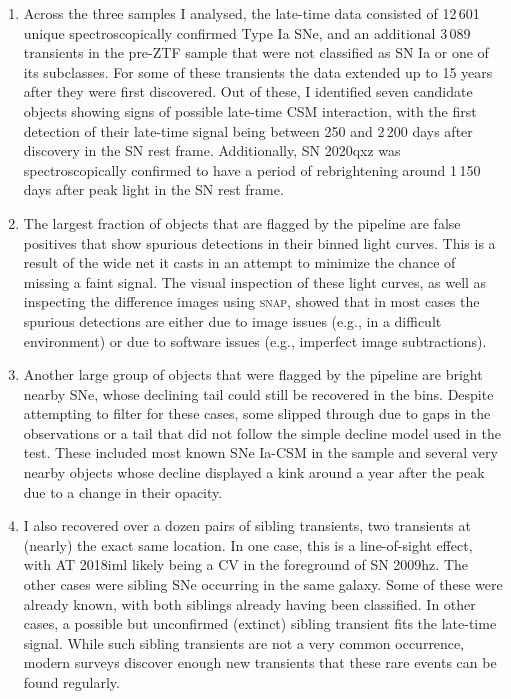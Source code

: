 \documentclass[a4paper,oneside,12pt, class=Latex/Classes/PhDthesisPSnPDF, crop=false]{standalone}
\begin{document}
\begin{enumerate}
	\item Across the three samples I analysed, the late-time data consisted of 12\,601 unique spectroscopically confirmed Type Ia SNe, and an additional 3\,089 transients in the pre-ZTF sample that were not classified as SN Ia or one of its subclasses. For some of these transients the data extended up to 15 years after they were first discovered. Out of these, I identified seven candidate objects showing signs of possible late-time CSM interaction, with the first detection of their late-time signal being between 250 and 2\,200 days after discovery in the SN rest frame. Additionally, SN 2020qxz was spectroscopically confirmed to have a period of rebrightening around 1\,150 days after peak light in the SN rest frame.
	\item The largest fraction of objects that are flagged by the pipeline are false positives that show spurious detections in their binned light curves. This is a result of the wide net it casts in an attempt to minimize the chance of missing a faint signal. The visual inspection of these light curves, as well as inspecting the difference images using \textsc{snap}, showed that in most cases the spurious detections are either due to image issues (e.g., in a difficult environment) or due to software issues (e.g., imperfect image subtractions).
	\item Another large group of objects that were flagged by the pipeline are bright nearby SNe, whose declining tail could still be recovered in the bins. Despite attempting to filter for these cases, some slipped through due to gaps in the observations or a tail that did not follow the simple decline model used in the test. These included most known SNe Ia-CSM in the sample and several very nearby objects whose decline displayed a kink around a year after the peak due to a change in their opacity.
	\item I also recovered over a dozen pairs of sibling transients, two transients at (nearly) the exact same location. In one case, this is a line-of-sight effect, with AT 2018iml likely being a CV in the foreground of SN 2009hz. The other cases were sibling SNe occurring in the same galaxy. Some of these were already known, with both siblings already having been classified. In other cases, a possible but unconfirmed (extinct) sibling transient fits the late-time signal. While such sibling transients are not a very common occurrence, modern surveys discover enough new transients that these rare events can be found regularly.

\end{enumerate}
\end{document}
